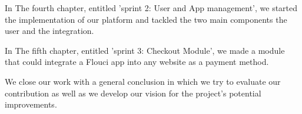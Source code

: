 \begin{spacing}{1.1}
In The fourth chapter, entitled 'sprint 2:  User and App management', we started the implementation of our platform and tackled the two main components the user and the integration.

In The fifth chapter, entitled 'sprint 3:  Checkout Module', we made a module that could integrate a Flouci app into any website as a payment method.
 
We close our work with a general conclusion in which we try to evaluate our contribution as well as we develop our vision for the project's potential improvements.



\end{spacing}

